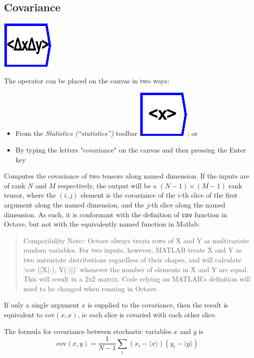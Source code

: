 \subsection{Covariance}

\label{Operation:covariance}

\includegraphics{images/covariance}

The operator can be placed on the canvas in two ways:
\begin{itemize}
\item From the \emph{Statistics (``statistics'')} toolbar \includegraphics{images/mean};
or 
\item By typing the letters "covariance" on the canvas and then pressing
the Enter key
\end{itemize}
Computes the covariance of two tensors along named dimension. If the
inputs are of rank $N$ and $M$ respectively, the output will be
a $(N-1)\times(M-1)$ rank tensor, where the $(i,j)$ element is the
covariance of the $i$-th slice of the first argument along the named
dimension, and the $j$-th slice along the named dimension. As such,
it is conformant with the definition of \texttt{cov} function in Octave,
but not with the equivalently named function in Matlab: 
\begin{quote}
Compatibility Note:: Octave always treats rows of X and Y as multivariate
random variables. For two inputs, however, MATLAB treats X and Y as
two univariate distributions regardless of their shapes, and will
calculate ‘cov ({[}X(:), Y(:){]})’ whenever the number of elements
in X and Y are equal. This will result in a 2x2 matrix. Code relying
on MATLAB’s definition will need to be changed when running in Octave. 
\end{quote}
If only a single argument $x$ is supplied to the covariance, then
the result is equivalent to cov$(x,x)$, ie each slice is covaried
with each other slice.

The formula for covariance between stochastic variables $x$ and $y$
is 
\[
\mathrm{cov}(x,y)=\frac{1}{N-1}\sum_{i}(x_{i}-\langle x\rangle)(y_{i}-\langle y\rangle)
\]


